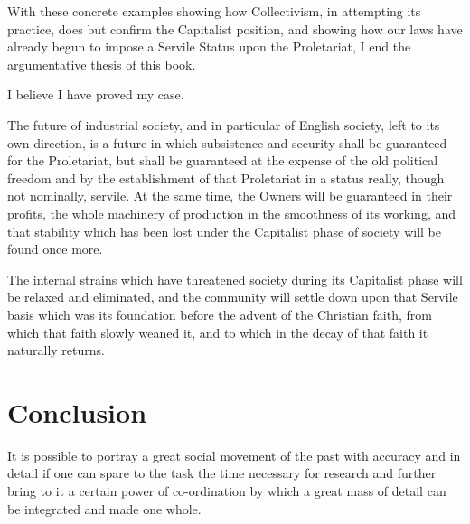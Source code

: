 \documentclass{book}
\begin{document}
With these concrete examples showing how Collectivism, in attempting its practice, does but confirm the Capitalist position, and showing how our laws have already begun to impose a Servile Status upon the Proletariat, I end the argumentative thesis of this book.

I believe I have proved my case.

The future of industrial society, and in particular of English society, left to its own direction, is a future in which subsistence and security shall be guaranteed for the Proletariat, but shall be guaranteed at the expense of the old political freedom and by the establishment of that Proletariat in a status really, though not nominally, servile. At the same time, the Owners will be guaranteed in their profits, the whole machinery of production in the smoothness of its working, and that stability which has been lost under the Capitalist phase of society will be found once more.

The internal strains which have threatened society during its Capitalist phase will be relaxed and eliminated, and the community will settle down upon that Servile basis which was its foundation before the advent of the Christian faith, from which that faith slowly weaned it, and to which in the decay of that faith it naturally returns.

\chapter*{Conclusion}
\label{chapter-10}
It is possible to portray a great social movement of the past with accuracy and in detail if one can spare to the task the time necessary for research and further bring to it a certain power of co-ordination by which a great mass of detail can be integrated and made one whole.
\end{document}
